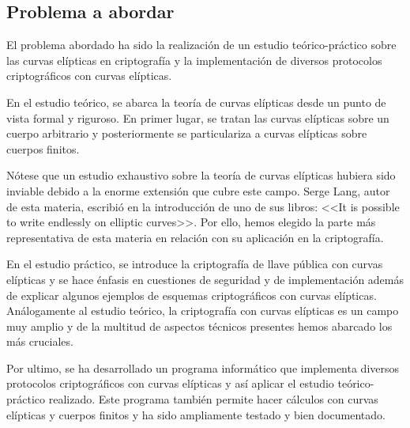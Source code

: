 \subsection{Problema a abordar}
\label{sub:Problema a abordar}


El problema abordado ha sido la realización de un estudio teórico-práctico sobre las curvas elípticas en criptografía y la implementación de diversos protocolos criptográficos con curvas elípticas.

En el estudio teórico, se abarca la teoría de curvas elípticas desde un punto de vista formal y riguroso. En primer lugar, se tratan las curvas elípticas sobre un cuerpo arbitrario y posteriormente se particulariza a curvas elípticas sobre cuerpos finitos.

Nótese que un estudio exhaustivo sobre la teoría de curvas elípticas hubiera sido inviable debido a la enorme extensión que cubre este campo. Serge Lang, autor de esta materia, escribió en la introducción de uno de sus libros: <<It is possible to write endlessly on elliptic curves>>. Por ello, hemos elegido la parte más representativa de esta materia en relación con su aplicación en la criptografía.

En el estudio práctico, se introduce la criptografía de llave pública con curvas elípticas y se hace énfasis en cuestiones de seguridad y de implementación además de explicar algunos ejemplos de esquemas criptográficos con curvas elípticas. Análogamente al estudio teórico, la criptografía con curvas elípticas es un campo muy amplio y de la multitud de aspectos técnicos presentes hemos abarcado los más cruciales.

Por ultimo, se ha desarrollado un programa informático que implementa diversos protocolos criptográficos con curvas elípticas y así aplicar el estudio teórico-práctico realizado. Este programa también permite hacer cálculos con curvas elípticas y cuerpos finitos y ha sido ampliamente testado y bien documentado.

